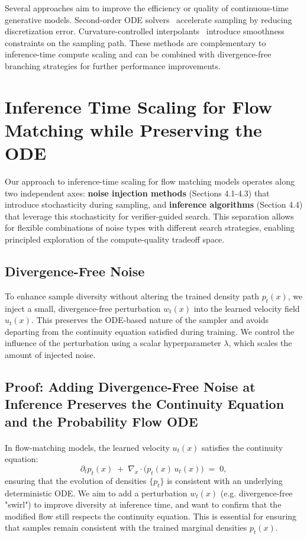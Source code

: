 \documentclass{article}
\begin{document}
Several approaches aim to improve the efficiency or quality of continuous-time generative models. Second-order ODE solvers~\cite{zhang2023secondorder} accelerate sampling by reducing discretization error. Curvature-controlled interpolants~\cite{dockhorn2023stochastic} introduce smoothness constraints on the sampling path. These methods are complementary to inference-time compute scaling and can be combined with divergence-free branching strategies for further performance improvements.

\section{Inference Time Scaling for Flow Matching while Preserving the ODE}

Our approach to inference-time scaling for flow matching models operates along two independent axes: \textbf{noise injection methods} (Sections 4.1-4.3) that introduce stochasticity during sampling, and \textbf{inference algorithms} (Section 4.4) that leverage this stochasticity for verifier-guided search. This separation allows for flexible combinations of noise types with different search strategies, enabling principled exploration of the compute-quality tradeoff space.

\subsection{Divergence-Free Noise}

To enhance sample diversity without altering the trained density path \(p_t(x)\), we inject a small, divergence-free perturbation \(w_t(x)\) into the learned velocity field \(u_t(x)\). This preserves the ODE-based nature of the sampler and avoids departing from the continuity equation satisfied during training. We control the influence of the perturbation using a scalar hyperparameter \(\lambda\), which scales the amount of injected noise.

\subsection{Proof: Adding Divergence-Free Noise at Inference Preserves the Continuity Equation and the Probability Flow ODE}

\paragraph{}  
In flow-matching models, the learned velocity \(u_t(x)\) satisfies the continuity equation:
\[
\partial_t p_t(x)\;+\;\nabla_x\!\cdot\!\bigl(p_t(x)\,u_t(x)\bigr)\;=\;0,
\tag{CE}
\]
ensuring that the evolution of densities \(\{p_t\}\) is consistent with an underlying deterministic ODE.  
We aim to add a perturbation \(w_t(x)\) (e.g. divergence-free "swirl") to improve diversity at inference time, and want to confirm that the modified flow still respects the continuity equation. This is essential for ensuring that samples remain consistent with the trained marginal densities \(p_t(x)\).
\end{document}
